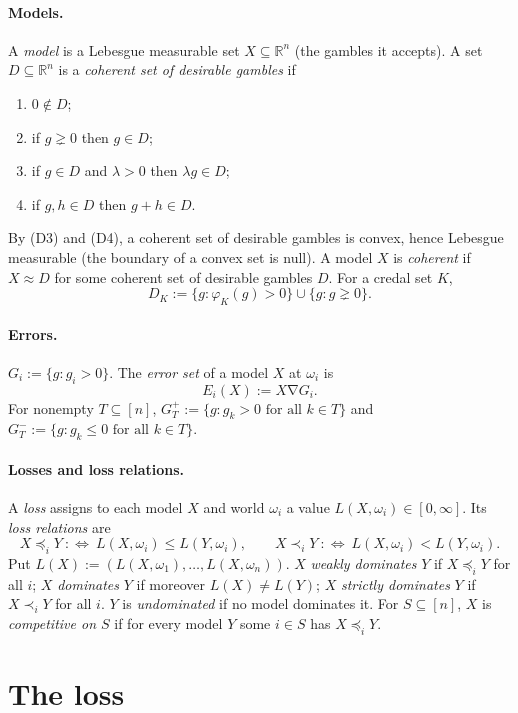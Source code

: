 \documentclass[11pt]{article}
\theoremstyle{definition}
\newcommand{\R}{\mathbb R}
\newcommand{\sd}{\mathbin{\nabla}}
\begin{document}
\paragraph{Models.}
A \emph{model} is a Lebesgue measurable set $X\subseteq\R^n$ (the gambles it accepts). A set $D\subseteq\R^n$ is a \emph{coherent set of desirable gambles} if
\begin{enumerate}[label=(D\arabic*),itemsep=0pt]
\item $0\notin D$;
\item if $g\gneq 0$ then $g\in D$;
\item if $g\in D$ and $\lambda>0$ then $\lambda g\in D$;
\item if $g,h\in D$ then $g+h\in D$.
\end{enumerate}
By (D3) and (D4), a coherent set of desirable gambles is convex, hence Lebesgue measurable (the boundary of a convex set is null). A model $X$ is \emph{coherent} if $X\approx D$ for some coherent set of desirable gambles $D$. For a credal set $K$,
\[
D_K:=\{g:\varphi_K(g)>0\}\cup\{g:g\gneq 0\}.
\]

\paragraph{Errors.}
$G_i:=\{g:g_i>0\}$. The \emph{error set} of a model $X$ at $\omega_i$ is
\[
E_i(X):=X\sd G_i.
\]
For nonempty $T\subseteq[n]$, $G_T^+:=\{g:g_k>0\text{ for all }k\in T\}$ and $G_T^-:=\{g:g_k\le 0\text{ for all }k\in T\}$.

\paragraph{Losses and loss relations.}
A \emph{loss} assigns to each model $X$ and world $\omega_i$ a value $L(X,\omega_i)\in[0,\infty]$. Its \emph{loss relations} are
\[
X\preceq_i Y\ :\iff\ L(X,\omega_i)\le L(Y,\omega_i),\qquad X\prec_i Y\ :\iff\ L(X,\omega_i)<L(Y,\omega_i).
\]
Put $L(X):=(L(X,\omega_1),\dots,L(X,\omega_n))$. $X$ \emph{weakly dominates} $Y$ if $X\preceq_i Y$ for all $i$; $X$ \emph{dominates} $Y$ if moreover $L(X)\neq L(Y)$; $X$ \emph{strictly dominates} $Y$ if $X\prec_i Y$ for all $i$. $Y$ is \emph{undominated} if no model dominates it. For $S\subseteq[n]$, $X$ is \emph{competitive on $S$} if for every model $Y$ some $i\in S$ has $X\preceq_i Y$.

\section{The loss}\label{sec:loss}
\end{document}
